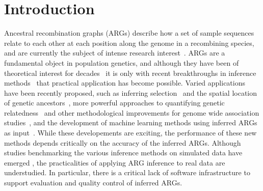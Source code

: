 \documentclass[unnumsec,webpdf,contemporary,large,namedate]{oup-authoring-template}%
\begin{document}
 \maketitle 

\section{Introduction}
Ancestral recombination graphs (ARGs) describe how a set of sample
sequences relate to each other at each position along the genome in a
recombining
species, and are currently the subject of intense research
interest~\citep{brandt2024promise,lewanski2024era,nielsen2024inference,
    wong2024general}. ARGs are a fundamental object in population genetics,
and although they have been of theoretical interest for
decades~\citep{Hudson1983,Griffiths1997} it is only with recent breakthroughs
in inference methods~\citep{rasmussen2014genome,
    speidel2019method,kelleher2019inferring,wohns2022unified,zhang2023biobank,
    gunnarsson2024scalable,deng2024robust} that practical application has
become possible. Varied applications have been recently proposed,
such as inferring selection~\citep{stern2019approximate,hejase2022deep} and
the spatial location of genetic ancestors~\citep{osmond2024estimating,deraje2024inferring,grundler2025geographic},
more powerful approaches to quantifying genetic
relatedness~\citep{fan2022genealogical,zhang2023biobank,gunnarsson2024scalable,lehmann2025on}
and other methodological improvements for genome wide association
studies~\citep{nowbandegani2023extremely,link2023tree},
and the development of machine learning methods using inferred
ARGs as input~\citep{hejase2022deep,pearson2023local,korfmann2024simultaneous,
whitehouse2024tree}.
While these developements are exciting, the performance 
of these new methods depends critically on the accuracy of the inferred ARGs.
Although studies benchmarking the various inference methods on 
simulated data have emerged 
\citep{brandt2022evaluation,deng2024robust,peng2024evaluating},
the practicalities of applying ARG inference to real data are 
understudied. In particular, there is a critical lack of software 
infrastructure to support evaluation and quality control of 
inferred ARGs.
\end{document}
